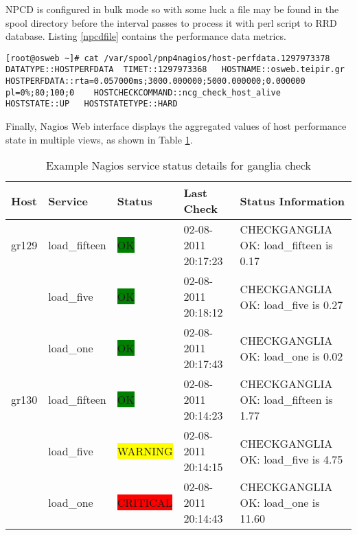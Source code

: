 NPCD is configured in bulk mode so with some luck a file may be found in the spool directory before the interval passes to process it with perl script to RRD database. Listing \ref{npcdfile} contains the performance data metrics.

\begin{lstlisting}[caption=NPCD temporary file in spool directory,label=npcdfile]
[root@osweb ~]# cat /var/spool/pnp4nagios/host-perfdata.1297973378 
DATATYPE::HOSTPERFDATA	TIMET::1297973368	HOSTNAME::osweb.teipir.gr	HOSTPERFDATA::rta=0.057000ms;3000.000000;5000.000000;0.000000 pl=0%;80;100;0	HOSTCHECKCOMMAND::ncg_check_host_alive	HOSTSTATE::UP	HOSTSTATETYPE::HARD
\end{lstlisting}

Finally, Nagios Web interface displays the aggregated values of host performance state in multiple views, as shown in Table \ref{tab:nagios_service_detail}.

\begin{table}[ht]
\small\addtolength{\tabcolsep}{-3pt}
\begin{tabular}{ | l | l | l | l | l |}
\hline
 Host & Service & Status & Last Check & Status Information \\ \hline
 gr129 & load\_fifteen & \colorbox{green}{OK} & 02-08-2011 20:17:23 & CHECKGANGLIA OK: load\_fifteen is 0.17 \\
\hline
  & load\_five & \colorbox{green}{OK} & 02-08-2011 20:18:12 & CHECKGANGLIA OK: load\_five is 0.27 \\
\hline
  & load\_one & \colorbox{green}{OK} & 02-08-2011 20:17:43 & CHECKGANGLIA OK: load\_one is 0.02 \\
\hline
 gr130 & load\_fifteen & \colorbox{green}{OK} & 02-08-2011 20:14:23 & CHECKGANGLIA OK: load\_fifteen is 1.77 \\
\hline
  & load\_five & \colorbox{yellow}{WARNING} & 02-08-2011 20:14:15 & CHECKGANGLIA OK: load\_five is 4.75 \\
\hline
 & load\_one & \colorbox{red}{CRITICAL} & 02-08-2011 20:14:43 & CHECKGANGLIA OK: load\_one is 11.60 \\
\hline
\end{tabular}
\caption{Example Nagios service status details for ganglia check}
\label{tab:nagios_service_detail}
\end{table}

